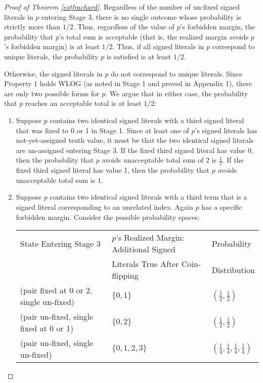 \documentclass{article}
\begin{document}
\begin{proof}[Proof of Theorem \ref{extfrachard}]
Regardless of the number of un-fixed signed literals in $p$ entering Stage 3, there is no single outcome whose probability is strictly more than $1/2$.  Thus, regardless of the value of $p$'s forbidden margin, the probability that $p$'s total sum is acceptable (that is, the realized margin avoids $p$'s forbidden margin) is at least $1/2$. Thus, if all signed literals in $p$ correspond to unique literals, the probability $p$ is satisfied is at least $1/2$.



Otherwise, the signed literals in $p$ do not correspond to unique literals. Since  Property 1 holds WLOG (as noted in Stage 1 and proved in Appendix 1), there are only two possible forms for $p$. We argue that in either case, the probability that $p$ reaches an acceptable total is at least $1/2$:

\vspace{-3mm}

\begin{enumerate}
\item Suppose $p$ contains two identical signed literals with a third signed literal that was fixed to 0 or 1 in Stage 1. Since at least one of $p$'s signed literals has not-yet-assigned truth value, 
it must be that the two identical signed literals are un-assigned entering Stage 3. If the fixed third signed literal has value 0, then the probability that $p$ avoids unacceptable total sum of 2 is $\frac{1}{2}$. If the fixed third signed literal has value 1, then the probability that $p$ avoids unacceptable total sum is $1$.

\vspace{-2mm}

\item Suppose $p$ contains two identical signed literals with a third term that is a signed literal corresponding to an unrelated index. Again $p$ has a specific forbidden margin. Consider the possible probability spaces:


\begin{tabular}{|l|l|l|} \hline
State Entering Stage 3 & $p$'s Realized Margin: Additional Signed  & Probability  \\
 & Literals True After Coin-flipping& Distribution  \\
\hline
(pair fixed at 0 or 2, single un-fixed)& $\{0,1\}$&$(\frac{1}{2},\frac{1}{2})$\\  
\hline
(pair un-fixed, single fixed at 0 or 1) & $\{0,2\}$& $(\frac{1}{2},\frac{1}{2})$\\ 
\hline
(pair un-fixed, single un-fixed) & $\{0,1,2,3\}$& $(\frac{1}{4},\frac{1}{4},\frac{1}{4},\frac{1}{4} )$\\ 
\hline
\end{tabular}


\end{enumerate}
\end{proof}
\end{document}
